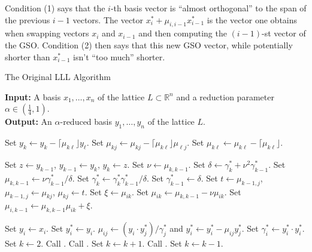 \documentclass[11pt,letterpaper]{article}
\newcommand{\reals}{\mathbb{R}}
\theoremstyle{definition}
\begin{document}
\noindent Condition (1) says that the $i$-th basis vector is ``almost orthogonal'' to the span of the previous $i-1$ vectors. The vector $x_i^*+\mu_{i, i-1}x_{i-1}^*$ is the vector one obtains when swapping vectors $x_i$ and $x_{i-1}$ and then computing the $(i-1)$-st vector of the GSO. Condition (2) then says that this new GSO vector, while potentially shorter than $x_{i-1}^*$ isn't ``too much'' shorter.\\
\begin{algorithm}
\caption{The Original LLL Algorithm}
\textbf{Input: }A basis $x_1, \ldots, x_n$ of the lattice $L\subset \reals^n$ and a reduction parameter $\alpha\in (\frac{1}{4}, 1)$.\\
\textbf{Output: }An $\alpha$-reduced basis $y_1, \ldots, y_n$ of the lattice $L$.
\begin{algorithmic}[1]
			\State Set $y_k \gets y_k - \lceil \mu_{k\ell}\rfloor y_\ell$.
				\State Set $\mu_{kj}\gets \mu_{kj}-\lceil\mu_{k\ell}\rfloor\mu_{\ell j}$.
			\EndFor
			\State Set $\mu_{k\ell}\gets \mu_{k\ell}-\lceil \mu_{k\ell}\rfloor$.
		\EndIf
	\EndProcedure

		\State Set $z\gets y_{k-1}$, $y_{k-1}\gets y_k$, $y_k\gets z$.
		\State Set $\nu\gets \mu_{k, k-1}$. Set $\delta \gets \gamma_k^* + \nu^2\gamma_{k-1}^*$.
		\State Set $\mu_{k, k-1}\gets \nu\gamma_{k-1}^*/\delta$. Set $\gamma_k^*\gets \gamma_k^*\gamma_{k-1}^*/\delta$. Set $\gamma_{k-1}^*\gets \delta$.
			\State Set $t\gets \mu_{k-1, j}$, $\mu_{k-1, j}\gets \mu_{kj}$, $\mu_{kj}\gets t$.
		\EndFor
			\State Set $\xi \gets \mu_{ik}$. Set $\mu_{ik}\gets \mu_{k,k-1}-\nu\mu_{ik}$.
			\State Set $\mu_{i,k-1}\gets \mu_{k, k-1}\mu_{ik}+\xi$.
		\EndFor
	\EndProcedure

			\State Set $y_i\gets x_i$.
		\EndFor
			\State Set $y_i^*\gets y_i$.
				\State $\mu_{ij}\gets (y_i\cdot y_j^*)/\gamma_j^*$ and $y_i^*\gets y_i^*-\mu_{ij}y_j^*$.
			\EndFor
			\State Set $\gamma_i^*\gets y_i^*\cdot y_i^*$.
		\EndFor
		\State Set $k\gets 2$.
			\State Call .
					\State Call .
				\EndFor
				\State Set $k\gets k+1$.
			\Else
				\State Call .
					\State Set $k\gets k-1$.
				\EndIf
			\EndIf
		\EndWhile
	\EndProcedure
\end{algorithmic}
\end{algorithm}
\end{document}
